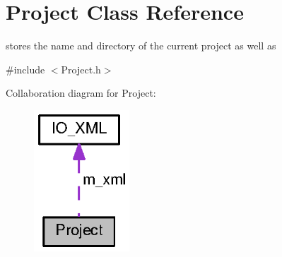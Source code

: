 \section{Project Class Reference}
\label{class_project}


stores the name and directory of the current project as well as  




{\ttfamily \#include $<$Project.\-h$>$}



Collaboration diagram for Project\-:\nopagebreak
\begin{figure}[H]
\begin{center}
\leavevmode
\includegraphics[width=101pt]{class_project__coll__graph}
\end{center}
\end{figure}
